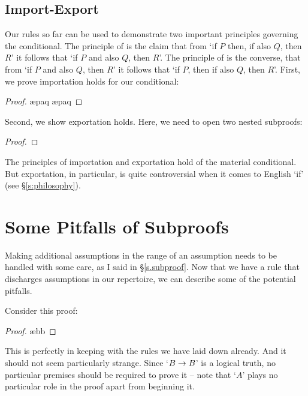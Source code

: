 \subsection{Import-Export}\label{import.export}
Our rules so far can be used to demonstrate two important principles governing the conditional. The principle of  is the claim that from `if $P$ then, if also $Q$, then $R$' it follows that `if $P$ and also $Q$, then $R$'. The principle of  is the converse, that from `if $P$ and also $Q$, then $R$' it follows that `if $P$, then if also $Q$, then $R$'. First, we prove importation holds for our conditional: \begin{proof}
	\open
	\ae{paq}
	\ae{paq}
	\close
\end{proof}
Second, we show exportation holds. Here, we need to open two nested subproofs:
\begin{proof}
	\open
	\open
	\close
	\close
\end{proof}

The principles of importation and exportation hold of the material conditional. But exportation, in particular, is quite controversial when it comes to English `if' (see §\ref{s:philosophy}).

\section{Some Pitfalls of Subproofs}\label{pitfalls}


Making additional assumptions in the range of an assumption needs to be handled with some care, as I said in §\ref{s.subproof}. Now that we have a rule that discharges assumptions in our repertoire, we can describe some of the potential pitfalls.

Consider this proof:
\begin{proof}
	\open
		 \ae{bb}
	\close
\end{proof}
This is perfectly in keeping with the rules we have laid down already. And it should not seem particularly strange. Since `$B \rightarrow B$' is a logical truth, no particular premises should be required to prove it – note that `$A$' plays no particular role in the proof apart from beginning it. 

